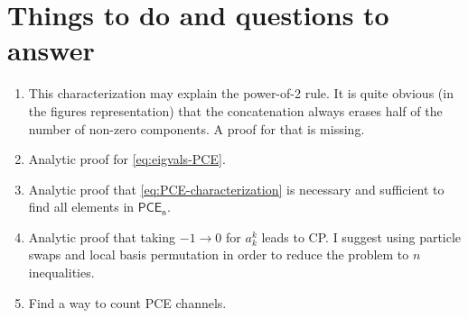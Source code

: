 \documentclass[11pt,dvipsnames]{article} %
\newcommand{\1}{\mathds{1}}
\newcommand{\PCE}[1]{\mathsf{PCE}_\mathsf{#1}}
\begin{document}
\section*{Things to do and questions to answer} %
\begin{enumerate}
\item This characterization may explain the power-of-2 rule. 
It is quite obvious (in the figures representation) that the concatenation
always erases half of the number of non-zero components. A proof 
for that is missing.
\item Analytic proof for \eqref{eq:eigvals-PCE}. 
\item Analytic proof that \eqref{eq:PCE-characterization} is necessary 
and sufficient to find all elements in $\PCE{n}$.
\item Analytic proof that taking $-1\to 0$ for $a_k^k$ leads to CP.
I suggest using particle swaps and local basis permutation in order 
to reduce the problem to $n$ inequalities.
\item Find a way to count PCE channels.
\end{enumerate}


\end{document}
